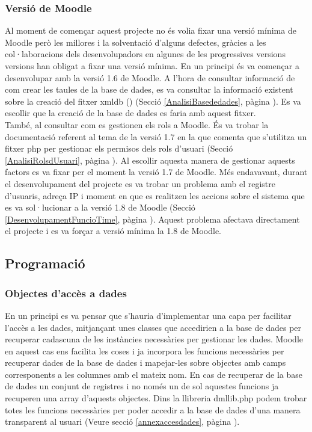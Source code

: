 \documentclass[a4paper]{report}  %
\begin{document}
\subsubsection{Versió de Moodle}\label{VersioMoodle}	
Al moment de començar aquest projecte no és volia fixar una versió mínima de Moodle però les millores i la solventació d'alguns defectes, gràcies a les col·laboracions dels desenvolupadors en algunes de les progressives versions versions han obligat a fixar una versió mínima.
En un principi és va començar a desenvolupar amb la versió 1.6 de Moodle.
A l'hora de consultar informació de com crear les taules de la base de dades, es va consultar la informació existent sobre la creació del fitxer xmldb () (Secció \ref{AnalisiBasededades}, pàgina \pageref{AnalisiBasededades} ). Es va escollir que la creació de la base de dades es faria amb aquest fitxer.\\
També, al consultar com es gestionen els rols a Moodle. És va trobar la documentació referent al tema de la versió 1.7 en la que comenta que s'utilitza un fitxer php per gestionar els permisos dels rols d'usuari (Secció \ref{AnalisiRolsdUsuari}, pàgina \pageref{AnalisiRolsdUsuari}).
Al escollir aquesta manera de gestionar aquests factors es va fixar per el moment la versió 1.7 de Moodle.
Més endavavant, durant el desenvolupament del projecte es va trobar un problema amb el registre d'usuaris, adreça IP i moment en que es realitzen les accions sobre el sistema  que es va sol·lucionar a la versió 1.8 de Moodle (Secció \ref{DesenvolupamentFuncioTime}, pàgina \pageref{DesenvolupamentFuncioTime}). Aquest problema afectava directament el projecte i es va forçar a versió mínima la 1.8 de Moodle.

\subsection{Programació}
\subsubsection{Objectes d'accès a dades}
En un principi es va pensar que s'hauria d'implementar una capa per facilitar l'accès a les dades, mitjançant unes classes que accedirien a la base de dades per recuperar cadascuna de les instàncies necessàries per gestionar les dades.
Moodle en aquest cas ens facilita les coses i ja incorpora les funcions necessàries per recuperar dades de la base de dades i mapejar-les sobre objectes amb camps corresponents a les columnes amb el mateix nom. En cas de recuperar de la base de dades un conjunt de registres i no només un de sol aquestes funcions ja recuperen una array d'aquests objectes.
Dins la llibreria dmllib.php podem trobar totes les funcions necessàries per poder accedir a la base de dades d'una manera transparent al usuari (Veure secció \ref{annexaccesdades}, pàgina \pageref{annexaccesdades} ).
\end{document}
